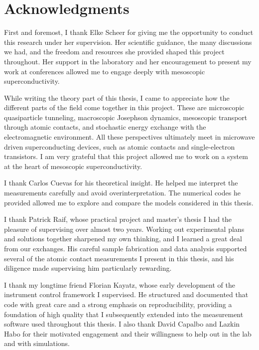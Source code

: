 
\pagestyle{acknowledgement}
\thispagestyle{acknowledgement}

\chapter*{Acknowledgments}

    First and foremost, I thank Elke Scheer for giving me the opportunity to conduct this research under her supervision. Her scientific guidance, the many discussions we had, and the freedom and resources she provided shaped this project throughout. Her support in the laboratory and her encouragement to present my work at conferences allowed me to engage deeply with mesoscopic superconductivity.
    
    While writing the theory part of this thesis, I came to appreciate how the different parts of the field come together in this project. These are microscopic quasiparticle tunneling, macroscopic Josephson dynamics, mesoscopic transport through atomic contacts, and stochastic energy exchange with the electromagnetic environment. All these perspectives ultimately meet in microwave driven superconducting devices, such as atomic contacts and single-electron transistors. I am very grateful that this project allowed me to work on a system at the heart of mesoscopic superconductivity.

    I thank Carlos Cuevas for his theoretical insight. He helped me interpret the measurements carefully and avoid overinterpretation. The numerical codes he provided allowed me to explore and compare the models considered in this thesis.

    I thank Patrick Raif, whose practical project and master's thesis I had the pleasure of supervising over almost two years. Working out experimental plans and solutions together sharpened my own thinking, and I learned a great deal from our exchanges. His careful sample fabrication and data analysis supported several of the atomic contact measurements I present in this thesis, and his diligence made supervising him particularly rewarding.

    I thank my longtime friend Florian Kayatz, whose early development of the instrument control framework I supervised. He structured and documented that code with great care and a strong emphasis on reproducibility, providing a foundation of high quality that I subsequently extended into the measurement software used throughout this thesis. I also thank David Capalbo and Lazkin Habo for their motivated engagement and their willingness to help out in the lab and with simulations.

